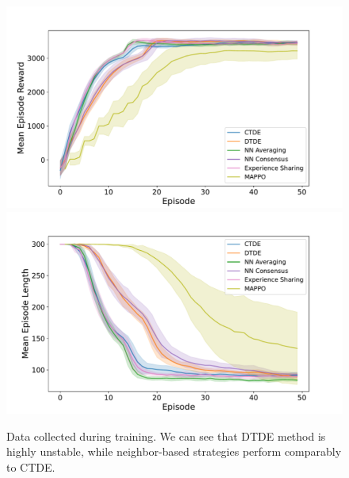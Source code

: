 \documentclass[sigconf]{acmart}
\begin{document}
\begin{figure}
  \centering
  \includegraphics[width=1\linewidth]{figures/episode_reward_mean.pdf}
  \includegraphics[width=1\linewidth]{figures/episode_len_mean.pdf}
  \caption{Data collected during training. 
  We can see that DTDE method is highly unstable, while neighbor-based strategies perform 
  comparably to CTDE.
  }
  \label{fig:results}
\end{figure}
\end{document}
